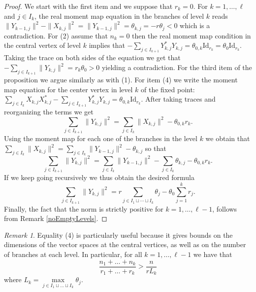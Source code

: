 \documentclass{amsart}
\theoremstyle{plain}
\numberwithin{equation}{section}
\theoremstyle{definition}
\theoremstyle{remark}
\newtheorem{remark}[theorem]{Remark}
\begin{document}
	\begin{proof}
		We start with the first item and we suppose that $r_k=0$. For $k=1,\ldots,\ell$ and $j\in I_k$, the real moment map equation in the branches of level $k$ reads $\|Y_{k-1,j}\|^2-\|X_{k,j}\|^2=\|Y_{k-1,j}\|^2=\theta_{k,j}=-r\theta_j< 0$ which is a contradiction. For (2) assume that $n_k=0$ then the real moment map condition in the central vertex of level $k$ implies that $-\sum_{j\in I_{k+1}}Y_{k,j}^*Y_{k,j}=\theta_{0,k}\text{Id}_{r_k}=\theta_0\text{Id}_{r_k}$. Taking the trace on both sides of the equation we get that $-\sum_{j\in I_{k+1}}\|Y_{k,j}\|^2=r_k\theta_0>0$ yielding a contradiction. For the third item of the proposition we argue similarly as with (1). For item (4) we write the moment map equation for the center vertex in level $k$ of the fixed point: $\sum_{j\in I_k}X_{k,j}X_{k,j}^*-\sum_{j\in I_{k+1}}Y_{k,j}^*Y_{k,j}=\theta_{0,k}\text{Id}_{r_k}$. After taking traces and reorganizing the terms we get $$\sum_{j\in I_{k+1}}\|Y_{k,j}\|^2=\sum_{j\in I_k}\|X_{k,j}\|^2-\theta_{0,k}r_k.$$ Using the moment map for each one of the branches in the level $k$ we obtain that $\sum_{j\in I_k}\|X_{k,j}\|^2=\sum_{j\in I_k}\|Y_{k-1,j}\|^2-\theta_{k,j}$ so that 
		$$
		\sum_{j\in I_{k+1}}\|Y_{k,j}\|^2=\sum_{j\in I_k}\|Y_{k-1,j}\|^2-\sum_{j\in I_k}\theta_{k,j}-\theta_{0,k}r_k.
		$$
		If we keep going recursively we thus obtain the desired formula
		$$
		\sum_{j\in I_{k+1}}\|Y_{k,j}\|^2=r\sum_{j\in I_1\sqcup\cdots\sqcup I_k}\theta_j-\theta_0\sum_{j=1}^{k}r_j.
		$$
		Finally, the fact that the norm is strictly positive for $k=1,\ldots,\ell-1$, follows from Remark \ref{noEmptyLevels}.
	\end{proof}
	\begin{remark}
		Equality (4) is particularly useful because it gives bounds on the dimensions of the vector spaces at the central vertices, as well as on the number of branches at each level. In particular, for all $k=1,\ldots,\ell-1$ we have that 
		$$
		\frac{n_1+\ldots+n_k}{r_1+\ldots+r_k}> \frac{n}{rL_k}
		$$
		where $L_k=\max\limits_{j\in I_1\sqcup\ldots\sqcup I_{k}}\theta_j$.
	\end{remark}
\end{document}
